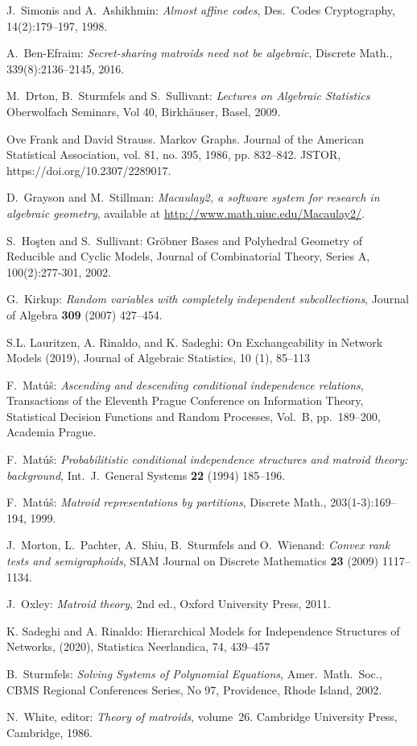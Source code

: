 \documentclass[12pt]{extarticle}
\theoremstyle{definition}
\numberwithin{theorem}{section}
\begin{document}
\begin{thebibliography}{10}

J.~Simonis and A.~Ashikhmin: {\em Almost affine codes},
Des.~Codes Cryptography, 14(2):179--197, 1998.

A.~Ben-Efraim: {\em Secret-sharing matroids need not be algebraic},
Discrete Math., 339(8):2136--2145, 2016.

M.~Drton, B.~Sturmfels and S.~Sullivant: {\em Lectures on Algebraic Statistics}
Oberwolfach Seminars, Vol 40, Birkh\"auser, Basel, 2009.

Ove Frank and David Strauss. Markov Graphs. Journal of the American Statistical Association, vol. 81, no. 395, 1986, pp. 832--842. JSTOR, https://doi.org/10.2307/2289017. 

D.~Grayson and M.~Stillman:
{\em Macaulay2, a software system for research in algebraic geometry},
available at \url{http://www.math.uiuc.edu/Macaulay2/}.

S.~Ho\c{s}ten and S.~Sullivant: 
Gr\"obner Bases and Polyhedral Geometry of Reducible and Cyclic Models,
Journal of Combinatorial Theory, Series A,  100(2):277-301, 2002. 

G.~Kirkup: {\em Random variables with completely independent subcollections},
Journal of Algebra {\bf 309} (2007) 427--454.

S.L. Lauritzen, A. Rinaldo, and K. Sadeghi:
On Exchangeability in Network Models (2019), 
Journal of Algebraic Statistics, 10 (1), 85--113

F.~Mat\'u\v{s}: {\em Ascending and descending conditional independence relations},
Transactions of the Eleventh Prague Conference on Information Theory, Statistical Decision Functions and Random Processes,
Vol.~B, pp.~189--200, Academia Prague.

F.~Mat\'u\v{s}: {\em Probabilitistic conditional independence structures and matroid
theory: background}, Int.~J.~General Systems {\bf 22} (1994) 185--196.

F.~Mat\'u\v{s}: {\em Matroid representations by partitions},
Discrete Math., 203(1-3):169--194, 1999.

J.~Morton, L.~Pachter, A.~Shiu, B.~Sturmfels and O.~Wienand:
{\em Convex rank tests and semigraphoids},
SIAM Journal on Discrete Mathematics {\bf 23} (2009) 1117--1134.

J.~Oxley: {\em Matroid theory},
2nd ed., Oxford University Press, 2011.

K. Sadeghi and A. Rinaldo: Hierarchical Models for Independence Structures of Networks,  (2020), Statistica Neerlandica, 74, 439--457

B.~Sturmfels: {\em Solving Systems of Polynomial Equations},
Amer.~Math.~Soc., CBMS Regional Conferences Series, No 97, Providence, Rhode Island, 2002.

N.~White, editor: {\em Theory of matroids}, volume~26.
Cambridge University Press, Cambridge, 1986.

\end{thebibliography}
\end{document}
